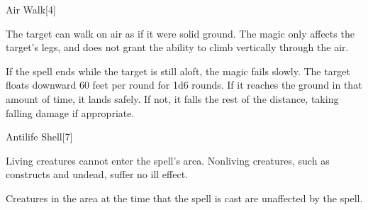 \begin{spellsection}{Air Walk}[4]
    \begin{spellheader}
    \end{spellheader}
    \begin{spellcontent}
        \begin{spelltargetinginfo}
        \end{spelltargetinginfo}
        \begin{spelleffects}
            \spelleffect The target can walk on air as if it were solid ground. The magic only affects the target's legs, and does not grant the ability to climb vertically through the air.
            \par If the spell ends while the target is still aloft, the magic fails slowly. The target floats downward 60 feet per round for 1d6 rounds. If it reaches the ground in that amount of time, it lands safely. If not, it falls the rest of the distance, taking falling damage if appropriate.
            \spelldur \durshort
        \end{spelleffects}
    \end{spellcontent}
    \begin{spellfooter}
        \miscastexplode
    \end{spellfooter}
\end{spellsection}

\begin{spellsection}{Antilife Shell}[7]
    \begin{spellheader}
    \end{spellheader}
    \begin{spellcontent}
        \begin{spelltargetinginfo}
        \end{spelltargetinginfo}
        \begin{spelleffects}
            \spelleffect Living creatures cannot enter the spell's area. Nonliving creatures, such as constructs and undead, suffer no ill effect.
            \spelldur \durmed \dismissable
        \end{spelleffects}
    \end{spellcontent}
    \begin{spellfooter}
        \spellnotes Creatures in the area at the time that the spell is cast are unaffected by the spell.
        \miscastexplode
    \end{spellfooter}
    \begin{spellaugments}
    \end{spellaugments}
\end{spellsection}

